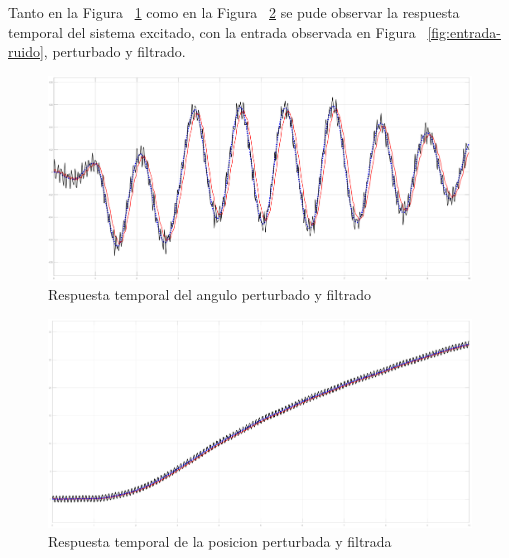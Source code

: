Tanto en la Figura ~\ref{fig:filtro-angle} como en la Figura ~\ref{fig:filtro-c} se pude observar la
respuesta temporal del sistema excitado, con la entrada observada
en Figura ~\ref{fig:entrada-ruido}, perturbado y filtrado.

\begin{figure}[t]
  \label{fig:filtro-angle}
  \includegraphics[scale=0.15]{Figuras/filtro-angle}
  \caption{Respuesta temporal del angulo perturbado y filtrado} 
\end{figure}

\begin{figure}[t]
  \label{fig:filtro-c}
  \includegraphics[scale=0.15]{Figuras/filtro-c}
  \caption{Respuesta temporal de la posicion perturbada y filtrada} 
\end{figure}
